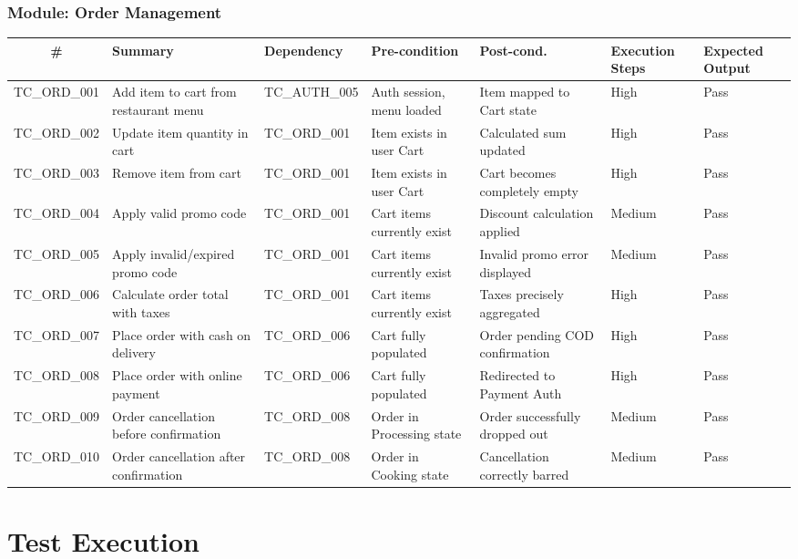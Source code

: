 \documentclass[12pt,a4paper]{report}
\begin{document}
\subsection{Module: Order Management}

\begin{longtable}{|c|p{1.8cm}|p{1.4cm}|p{1.8cm}|p{1.8cm}|p{2.2cm}|p{1.6cm}|}
\hline
\textbf{\#} & \textbf{Summary} & \textbf{Dependency} & \textbf{Pre-condition} & \textbf{Post-cond.} & \textbf{Execution Steps} & \textbf{Expected Output} \\
\hline
\endfirsthead
TC\_ORD\_001 & Add item to cart from restaurant menu & TC_AUTH_005 & Auth session, menu loaded & Item mapped to Cart state & High & Pass \\
\hline
TC\_ORD\_002 & Update item quantity in cart & TC_ORD_001 & Item exists in user Cart & Calculated sum updated & High & Pass \\
\hline
TC\_ORD\_003 & Remove item from cart & TC_ORD_001 & Item exists in user Cart & Cart becomes completely empty & High & Pass \\
\hline
TC\_ORD\_004 & Apply valid promo code & TC_ORD_001 & Cart items currently exist & Discount calculation applied & Medium & Pass \\
\hline
TC\_ORD\_005 & Apply invalid/expired promo code & TC_ORD_001 & Cart items currently exist & Invalid promo error displayed & Medium & Pass \\
\hline
TC\_ORD\_006 & Calculate order total with taxes & TC_ORD_001 & Cart items currently exist & Taxes precisely aggregated & High & Pass \\
\hline
TC\_ORD\_007 & Place order with cash on delivery & TC_ORD_006 & Cart fully populated & Order pending COD confirmation & High & Pass \\
\hline
TC\_ORD\_008 & Place order with online payment & TC_ORD_006 & Cart fully populated & Redirected to Payment Auth & High & Pass \\
\hline
TC\_ORD\_009 & Order cancellation before confirmation & TC_ORD_008 & Order in Processing state & Order successfully dropped out & Medium & Pass \\
\hline
TC\_ORD\_010 & Order cancellation after confirmation & TC_ORD_008 & Order in Cooking state & Cancellation correctly barred & Medium & Pass \\
\hline
\end{longtable}

\chapter{Test Execution}
\end{document}
